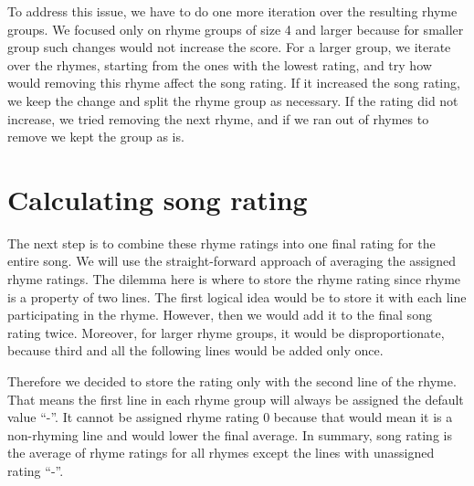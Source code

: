 To address this issue, we have to do one more iteration over the resulting rhyme groups. We focused only on rhyme groups of size 4 and larger because for smaller group such changes would not increase the score. For a larger group, we iterate over the rhymes, starting from the ones with the lowest rating, and try how would removing this rhyme affect the song rating. If it increased the song rating, we keep the change and split the rhyme group as necessary. If the rating did not increase, we tried removing the next rhyme, and if we ran out of rhymes to remove we kept the group as is.

\section{Calculating song rating}
The next step is to combine these rhyme ratings into one final rating for the entire song. We will use the straight-forward approach of averaging the assigned rhyme ratings. The dilemma here is where to store the rhyme rating since rhyme is a property of two lines. The first logical idea would be to store it with each line participating in the rhyme. However, then we would add it to the final song rating twice. Moreover, for larger rhyme groups, it would be disproportionate, because third and all the following lines would be added only once. 

Therefore we decided to store the rating only with the second line of the rhyme. That means the first line in each rhyme group will always be assigned the default value ``-''. It cannot be assigned rhyme rating 0 because that would mean it is a non-rhyming line and would lower the final average. In summary, song rating is the average of rhyme ratings for all rhymes except the lines with unassigned rating ``-''.
